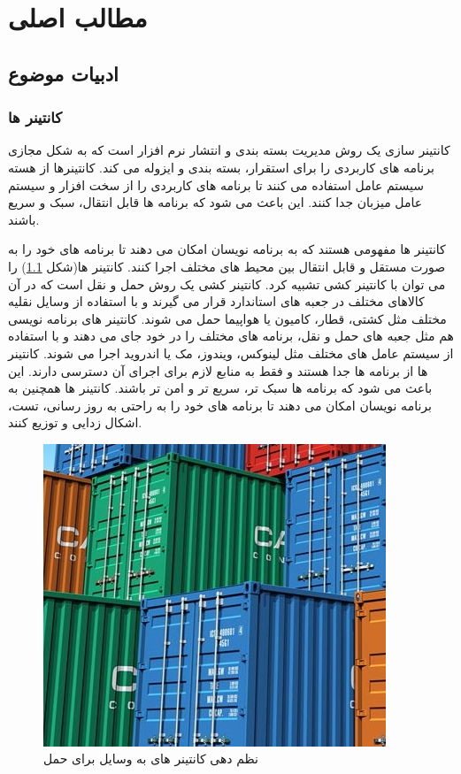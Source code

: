 
\chapter{مطالب اصلی}
\section{ادبیات موضوع}
\subsection{کانتینر ها}

کانتینر سازی یک روش مدیریت بسته بندی و انتشار نرم افزار است که به شکل مجازی برنامه های کاربردی را برای استقرار، بسته بندی و ایزوله می کند\cite{hayut1981containerization}. کانتینرها از هسته سیستم عامل استفاده می کنند تا برنامه های کاربردی را از سخت افزار و سیستم عامل میزبان جدا کنند. این باعث می شود که برنامه ها قابل انتقال، سبک و سریع باشند.


کانتینر ها مفهومی هستند که به برنامه نویسان امکان می دهند تا برنامه های خود را به صورت مستقل و قابل انتقال بین محیط های مختلف اجرا کنند. کانتینر ها(شکل \ref{Fig:container}) را می توان با کانتینر کشی تشبیه کرد. کانتینر کشی یک روش حمل و نقل است که در آن کالاهای مختلف در جعبه های استاندارد قرار می گیرند و با استفاده از وسایل نقلیه مختلف مثل کشتی، قطار، کامیون یا هواپیما حمل می شوند. کانتینر های برنامه نویسی هم مثل جعبه های حمل و نقل، برنامه های مختلف را در خود جای می دهند و با استفاده از سیستم عامل های مختلف مثل لینوکس، ویندوز، مک یا اندروید اجرا می شوند. کانتینر ها از برنامه ها جدا هستند و فقط به منابع لازم برای اجرای آن دسترسی دارند. این باعث می شود که برنامه ها سبک تر، سریع تر و امن تر باشند. کانتینر ها همچنین به برنامه نویسان امکان می دهند تا برنامه های خود را به راحتی به روز رسانی، تست، اشکال زدایی و توزیع کنند.

\begin{figure}[!htb]
  \centering
  \includegraphics[scale=1]{Figures/container.jpg}
  \caption{نظم دهی کانتینر های به وسایل برای حمل}
  \label{Fig:container}
  \end{figure}

